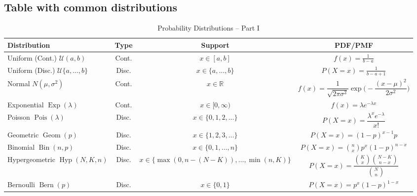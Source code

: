 \documentclass{article}
\begin{document}
\subsection{Table with common distributions}

\begin{table}[H]
\centering
\caption{Probability Distributions -- Part I}
\label{tab:dist_part1}
\renewcommand{\arraystretch}{1.3}
\begin{tabular}{l c c c}
\toprule
\textbf{Distribution} & \textbf{Type} & \textbf{Support} & \textbf{PDF/PMF} \\
\midrule
\makecell{Uniform \\ (Cont.) \\ $\mathcal{U}(a,b)$} & Cont. & $x\in[a,b]$ & $f(x)=\frac{1}{b-a}$ \\
\makecell{Uniform \\ (Disc.) \\ $\mathcal{U}\{a,\dots,b\}$} & Disc. & $x\in\{a,\dots,b\}$ & $P(X=x)=\frac{1}{b-a+1}$\\
\makecell{Normal \\ $N(\mu,\sigma^2)$} & Cont. & $x\in\mathbb{R}$ & $f(x)=\dfrac{1}{\sqrt{2\pi\sigma^2}}\exp\Big(-\dfrac{(x-\mu)^2}{2\sigma^2}\Big)$ \\
\makecell{Exponential \\ $\operatorname{Exp}(\lambda)$} & Cont. & $x\in[0,\infty)$ & $f(x)=\lambda e^{-\lambda x}$ \\
\makecell{Poisson \\ $\operatorname{Pois}(\lambda)$} & Disc. & $x\in\{0,1,2,\dots\}$ & $P(X=x)=\dfrac{\lambda^x e^{-\lambda}}{x!}$ \\
\makecell{Geometric \\ $\operatorname{Geom}(p)$} & Disc. & $x\in\{1,2,3,\dots\}$ & $P(X=x)=(1-p)^{x-1}p$ \\
\makecell{Binomial \\ $\operatorname{Bin}(n,p)$} & Disc. & $x\in\{0,1,\dots,n\}$ & $P(X=x)=\binom{n}{x}p^x(1-p)^{n-x}$ \\
\makecell{Hypergeometric \\ $\operatorname{Hyp}(N,K,n)$} & Disc. & $x\in\{\max(0,n-(N-K)),\dots,\min(n,K)\}$ & $P(X=x)=\dfrac{\binom{K}{x}\binom{N-K}{n-x}}{\binom{N}{n}}$ \\
\makecell{Bernoulli \\ $\operatorname{Bern}(p)$} & Disc. & $x\in\{0,1\}$ & $P(X=x)=p^x(1-p)^{1-x}$ \\
\bottomrule
\end{tabular}
\end{table}
\end{document}
